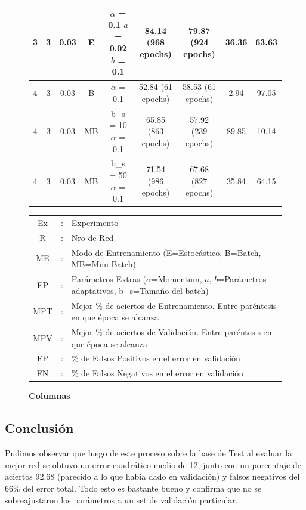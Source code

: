 \begin{figure}[H]
\begin{longtable}{ccccccccc}
	\hline
	3 & 3 & 0.03 & E  & \tcell{$\alpha$ = 0.1\\ $a$ = 0.02\\ $b$ = 0.1} & 84.14 (968 epochs) & 79.87 (924 epochs) & 36.36  & 63.63 \\
	\hline
	\hline
	4 & 3 & 0.03 & B  & $\alpha$ = 0.1                        & 52.84 (61 epochs)  & 58.53 (61 epochs)  & 2.94   & 97.05 \\
	\hline
	4 & 3 & 0.03 & MB & \tcell{b\_s = 10\\ $\alpha$ = 0.1}      & 65.85 (863 epochs) & 57.92 (239 epochs) & 89.85  & 10.14 \\
	\hline
	4 & 3 & 0.03 & MB & \tcell{b\_s = 50\\ $\alpha$ = 0.1}      & 71.54 (986 epochs) & 67.68 (827 epochs) & 35.84  & 64.15 \\
	\hline
\end{longtable}
\caption{\textbf{Columnas}}
\begin{tabular}{ccl}
         Ex & : & Experimento \\
         R & : & Nro de Red \\
         ME & : & Modo de Entrenamiento (E=Estocástico, B=Batch, MB=Mini-Batch)\\
         EP & : & Parámetros Extras ($\alpha$=Momentum, $a$, $b$=Parámetros adaptativos, b\_s=Tamaño del batch)\\
         MPT & : & Mejor \% de aciertos de Entrenamiento. Entre paréntesis en que época se alcanza\\
         MPV & : & Mejor \% de aciertos de Validación. Entre paréntesis en que época se alcanza\\
         FP & : & \% de Falsos Positivos en el error en validación\\
         FN & : & \% de Falsos Negativos en el error en validación
\end{tabular}
\end{figure}



\subsection{Conclusión}
Pudimos observar que luego de este proceso sobre la base de Test al evaluar la mejor red se obtuvo un error cuadrático medio de 12, junto con un porcentaje de aciertos 92.68 (parecido a lo que había dado en validación) y falsos negativos del 66\% del error total. Todo esto es bastante bueno y 
confirma que no se sobreajustaron los parámetros a un set de validación particular.

